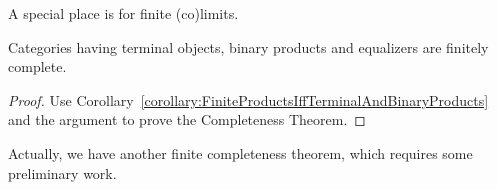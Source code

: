 %

A special place is for finite (co)limits.

\begin{proposition}
Categories having terminal objects, binary products and equalizers are finitely complete. 
\end{proposition}

\begin{proof}
Use Corollary~\ref{corollary:FiniteProductsIffTerminalAndBinaryProducts} and the argument to prove the Completeness Theorem.
\end{proof}

Actually, we have another finite completeness theorem, which requires some preliminary work.

